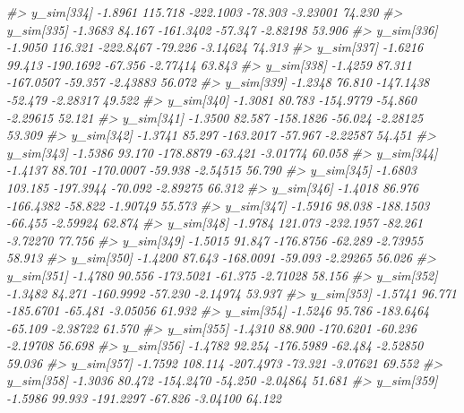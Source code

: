 \documentclass[
  10pt,
  italian,
  a4paper,
  extrafontsizes,onecolumn,openright
  ]{memoir}
\newenvironment{Shaded}{\begin{snugshade}}{\end{snugshade}}
\newcommand{\CommentTok}[1]{\textcolor[rgb]{0.56,0.35,0.01}{\textit{#1}}}
\begin{document}
\begin{Shaded}
\begin{Highlighting}[]
\CommentTok{\#\textgreater{}   y\_sim[334] {-}1.8961 115.718 {-}222.1003 {-}78.303 {-}3.23001 74.230}
\CommentTok{\#\textgreater{}   y\_sim[335] {-}1.3683  84.167 {-}161.3402 {-}57.347 {-}2.82198 53.906}
\CommentTok{\#\textgreater{}   y\_sim[336] {-}1.9050 116.321 {-}222.8467 {-}79.226 {-}3.14624 74.313}
\CommentTok{\#\textgreater{}   y\_sim[337] {-}1.6216  99.413 {-}190.1692 {-}67.356 {-}2.77414 63.843}
\CommentTok{\#\textgreater{}   y\_sim[338] {-}1.4259  87.311 {-}167.0507 {-}59.357 {-}2.43883 56.072}
\CommentTok{\#\textgreater{}   y\_sim[339] {-}1.2348  76.810 {-}147.1438 {-}52.479 {-}2.28317 49.522}
\CommentTok{\#\textgreater{}   y\_sim[340] {-}1.3081  80.783 {-}154.9779 {-}54.860 {-}2.29615 52.121}
\CommentTok{\#\textgreater{}   y\_sim[341] {-}1.3500  82.587 {-}158.1826 {-}56.024 {-}2.28125 53.309}
\CommentTok{\#\textgreater{}   y\_sim[342] {-}1.3741  85.297 {-}163.2017 {-}57.967 {-}2.22587 54.451}
\CommentTok{\#\textgreater{}   y\_sim[343] {-}1.5386  93.170 {-}178.8879 {-}63.421 {-}3.01774 60.058}
\CommentTok{\#\textgreater{}   y\_sim[344] {-}1.4137  88.701 {-}170.0007 {-}59.938 {-}2.54515 56.790}
\CommentTok{\#\textgreater{}   y\_sim[345] {-}1.6803 103.185 {-}197.3944 {-}70.092 {-}2.89275 66.312}
\CommentTok{\#\textgreater{}   y\_sim[346] {-}1.4018  86.976 {-}166.4382 {-}58.822 {-}1.90749 55.573}
\CommentTok{\#\textgreater{}   y\_sim[347] {-}1.5916  98.038 {-}188.1503 {-}66.455 {-}2.59924 62.874}
\CommentTok{\#\textgreater{}   y\_sim[348] {-}1.9784 121.073 {-}232.1957 {-}82.261 {-}3.72270 77.756}
\CommentTok{\#\textgreater{}   y\_sim[349] {-}1.5015  91.847 {-}176.8756 {-}62.289 {-}2.73955 58.913}
\CommentTok{\#\textgreater{}   y\_sim[350] {-}1.4200  87.643 {-}168.0091 {-}59.093 {-}2.29265 56.026}
\CommentTok{\#\textgreater{}   y\_sim[351] {-}1.4780  90.556 {-}173.5021 {-}61.375 {-}2.71028 58.156}
\CommentTok{\#\textgreater{}   y\_sim[352] {-}1.3482  84.271 {-}160.9992 {-}57.230 {-}2.14974 53.937}
\CommentTok{\#\textgreater{}   y\_sim[353] {-}1.5741  96.771 {-}185.6701 {-}65.481 {-}3.05056 61.932}
\CommentTok{\#\textgreater{}   y\_sim[354] {-}1.5246  95.786 {-}183.6464 {-}65.109 {-}2.38722 61.570}
\CommentTok{\#\textgreater{}   y\_sim[355] {-}1.4310  88.900 {-}170.6201 {-}60.236 {-}2.19708 56.698}
\CommentTok{\#\textgreater{}   y\_sim[356] {-}1.4782  92.254 {-}176.5989 {-}62.484 {-}2.52850 59.036}
\CommentTok{\#\textgreater{}   y\_sim[357] {-}1.7592 108.114 {-}207.4973 {-}73.321 {-}3.07621 69.552}
\CommentTok{\#\textgreater{}   y\_sim[358] {-}1.3036  80.472 {-}154.2470 {-}54.250 {-}2.04864 51.681}
\CommentTok{\#\textgreater{}   y\_sim[359] {-}1.5986  99.933 {-}191.2297 {-}67.826 {-}3.04100 64.122}

\end{Highlighting}
\end{Shaded}
\end{document}
